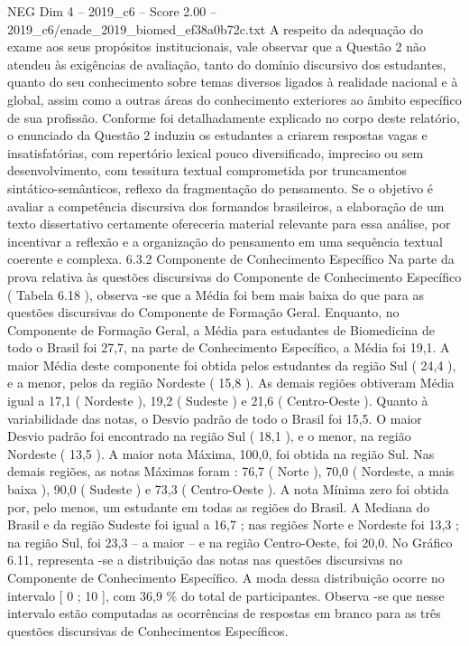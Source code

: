 \begin{textsample}{NEG Dim 4 – 2019\_c6 – Score 2.00 – 2019\_c6/enade\_2019\_biomed\_ef38a0b72c.txt}
A respeito da adequação do exame aos seus propósitos institucionais, vale observar que a Questão 2 não atendeu às exigências de avaliação, tanto do domínio discursivo dos estudantes, quanto do seu conhecimento sobre temas diversos ligados à realidade nacional e à global, assim como a outras áreas do conhecimento exteriores ao âmbito específico de sua profissão.
Conforme foi detalhadamente explicado no corpo deste relatório, o enunciado da Questão 2 induziu os estudantes a criarem respostas vagas e insatisfatórias, com repertório lexical pouco diversificado, impreciso ou sem desenvolvimento, com tessitura textual comprometida por truncamentos sintático-semânticos, reflexo da fragmentação do pensamento.
Se o objetivo é avaliar a competência discursiva dos formandos brasileiros, a elaboração de um texto dissertativo certamente ofereceria material relevante para essa análise, por incentivar a reflexão e a organização do pensamento em uma sequência textual coerente e complexa. 6.3.2 Componente de Conhecimento Específico Na parte da prova relativa às questões discursivas do Componente de Conhecimento Específico ( Tabela 6.18 ), observa -se que a Média foi bem mais baixa do que para as questões discursivas do Componente de Formação Geral.
Enquanto, no Componente de Formação Geral, a Média para estudantes de Biomedicina de todo o Brasil foi 27,7, na parte de Conhecimento Específico, a Média foi 19,1.
A maior Média deste componente foi obtida pelos estudantes da região Sul ( 24,4 ), e a menor, pelos da região Nordeste ( 15,8 ).
As demais regiões obtiveram Média igual a 17,1 ( Nordeste ), 19,2 ( Sudeste ) e 21,6 ( Centro-Oeste ).
Quanto à variabilidade das notas, o Desvio padrão de todo o Brasil foi 15,5.
O maior Desvio padrão foi encontrado na região Sul ( 18,1 ), e o menor, na região Nordeste ( 13,5 ).
A maior nota Máxima, 100,0, foi obtida na região Sul.
Nas demais regiões, as notas Máximas foram : 76,7 ( Norte ), 70,0 ( Nordeste, a mais baixa ), 90,0 ( Sudeste ) e 73,3 ( Centro-Oeste ).
A nota Mínima zero foi obtida por, pelo menos, um estudante em todas as regiões do Brasil.
A Mediana do Brasil e da região Sudeste foi igual a 16,7 ; nas regiões Norte e Nordeste foi 13,3 ; na região Sul, foi 23,3 – a maior – e na região Centro-Oeste, foi 20,0.
No Gráfico 6.11, representa -se a distribuição das notas nas questões discursivas no Componente de Conhecimento Específico.
A moda dessa distribuição ocorre no intervalo [ 0 ; 10 ], com 36,9 \% do total de participantes.
Observa -se que nesse intervalo estão computadas as ocorrências de respostas em branco para as três questões discursivas de Conhecimentos Específicos.

\end{textsample}
